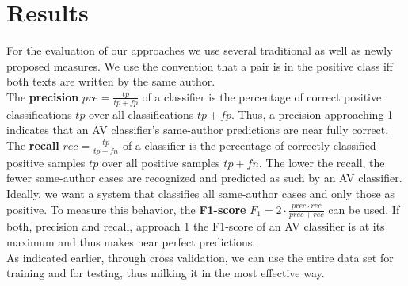 \chapter{Results}\label{results}
For the evaluation of our approaches we use several traditional as well as newly proposed measures.
We use the convention that a pair is in the positive class iff both texts are written by the same author.\\
The \textbf{precision} $pre = \frac{tp}{tp+fp}$ of a classifier is the percentage of correct positive classifications $tp$ over all classifications $tp+fp$.
Thus, a precision approaching 1 indicates that an AV classifier's same-author predictions are near fully correct.\\
The \textbf{recall} $rec = \frac{tp}{tp+fn}$ of a classifier is the percentage of correctly classified positive samples $tp$ over all positive samples $tp+fn$.
The lower the recall, the fewer same-author cases are recognized and predicted as such by an AV classifier.\\
Ideally, we want a system that classifies all same-author cases and only those as positive.
To measure this behavior, the \textbf{F1-score} $F_1 = 2\cdot\frac{prec\cdot{}rec}{prec+rec}$ can be used.
If both, precision and recall, approach 1 the F1-score of an AV classifier is at its maximum and thus makes near perfect predictions.\\







As indicated earlier, through cross validation, we can use the entire data set for training and for testing, thus milking it in the most effective way.





